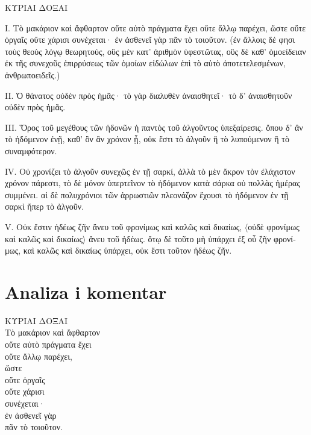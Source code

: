 {\large

\begin{greek}

\noindent ΚΥΡΙΑΙ ΔΟΞΑΙ

\noindent I. Τὸ μακάριον καὶ ἄφθαρτον οὔτε αὐτὸ πράγματα ἔχει οὔτε ἄλλῳ παρέχει, ὥστε οὔτε ὀργαῖς οὔτε χάρισι συνέχεται· ἐν ἀσθενεῖ γὰρ πᾶν τὸ τοιοῦτον. (ἐν ἄλλοις δέ φησι τοὺς θεοὺς λόγῳ θεωρητούς, οὓς μὲν κατ' ἀριθμὸν ὑφεστῶτας, οὓς δὲ καθ' ὁμοείδειαν ἐκ τῆς συνεχοῦς ἐπιρρύσεως τῶν ὁμοίων εἰδώλων ἐπὶ τὸ αὐτὸ ἀποτετελεσμένων, ἀνθρωποειδεῖς.)

\noindent II. Ὁ θάνατος οὐδὲν πρὸς ἡμᾶς· τὸ γὰρ διαλυθὲν ἀναισθητεῖ· τὸ δ' ἀναισθητοῦν οὐδὲν πρὸς ἡμᾶς.

\noindent III. Ὅρος τοῦ μεγέθους τῶν ἡδονῶν ἡ παντὸς τοῦ ἀλγοῦντος ὑπεξαίρεσις. ὅπου δ' ἂν τὸ ἡδόμενον ἐνῇ, καθ' ὃν ἂν χρόνον ᾖ, οὐκ ἔστι τὸ ἀλγοῦν ἢ τὸ λυπούμενον ἢ τὸ συναμφότερον.

\noindent IV. Οὐ χρονίζει τὸ ἀλγοῦν συνεχῶς ἐν τῇ σαρκί, ἀλλὰ τὸ μὲν ἄκρον τὸν ἐλάχιστον χρόνον πάρεστι, τὸ δὲ μόνον ὑπερτεῖνον τὸ ἡδόμενον κατὰ σάρκα οὐ πολλὰς ἡμέρας συμμένει. αἱ δὲ πολυχρόνιοι τῶν ἀρρωστιῶν πλεονάζον ἔχουσι τὸ ἡδόμενον ἐν τῇ σαρκὶ ἤπερ τὸ ἀλγοῦν.

\noindent V. Οὐκ ἔστιν ἡδέως ζῆν ἄνευ τοῦ φρονίμως καὶ καλῶς καὶ δικαίως, $\langle$οὐδὲ φρονίμως καὶ καλῶς καὶ δικαίως$\rangle$ ἄνευ τοῦ ἡδέως. ὅτῳ δὲ τοῦτο μὴ ὑπάρχει ἐξ οὗ ζῆν φρονίμως, καὶ καλῶς καὶ δικαίως ὑπάρχει, οὐκ ἔστι τοῦτον ἡδέως ζῆν.

\end{greek}

}


\section*{Analiza i komentar}


{\large
\begin{greek}
\noindent ΚΥΡΙΑΙ ΔΟΞΑΙ\\
Τὸ μακάριον καὶ ἄφθαρτον \\
οὔτε αὐτὸ πράγματα ἔχει \\
οὔτε ἄλλῳ παρέχει, \\
ὥστε \\
\tabto{2em} οὔτε ὀργαῖς \\
\tabto{2em} οὔτε χάρισι \\
συνέχεται· \\
ἐν ἀσθενεῖ γὰρ \\
πᾶν τὸ τοιοῦτον.\\

\end{greek}
}

